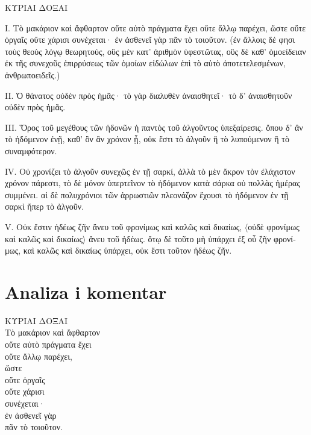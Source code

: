 {\large

\begin{greek}

\noindent ΚΥΡΙΑΙ ΔΟΞΑΙ

\noindent I. Τὸ μακάριον καὶ ἄφθαρτον οὔτε αὐτὸ πράγματα ἔχει οὔτε ἄλλῳ παρέχει, ὥστε οὔτε ὀργαῖς οὔτε χάρισι συνέχεται· ἐν ἀσθενεῖ γὰρ πᾶν τὸ τοιοῦτον. (ἐν ἄλλοις δέ φησι τοὺς θεοὺς λόγῳ θεωρητούς, οὓς μὲν κατ' ἀριθμὸν ὑφεστῶτας, οὓς δὲ καθ' ὁμοείδειαν ἐκ τῆς συνεχοῦς ἐπιρρύσεως τῶν ὁμοίων εἰδώλων ἐπὶ τὸ αὐτὸ ἀποτετελεσμένων, ἀνθρωποειδεῖς.)

\noindent II. Ὁ θάνατος οὐδὲν πρὸς ἡμᾶς· τὸ γὰρ διαλυθὲν ἀναισθητεῖ· τὸ δ' ἀναισθητοῦν οὐδὲν πρὸς ἡμᾶς.

\noindent III. Ὅρος τοῦ μεγέθους τῶν ἡδονῶν ἡ παντὸς τοῦ ἀλγοῦντος ὑπεξαίρεσις. ὅπου δ' ἂν τὸ ἡδόμενον ἐνῇ, καθ' ὃν ἂν χρόνον ᾖ, οὐκ ἔστι τὸ ἀλγοῦν ἢ τὸ λυπούμενον ἢ τὸ συναμφότερον.

\noindent IV. Οὐ χρονίζει τὸ ἀλγοῦν συνεχῶς ἐν τῇ σαρκί, ἀλλὰ τὸ μὲν ἄκρον τὸν ἐλάχιστον χρόνον πάρεστι, τὸ δὲ μόνον ὑπερτεῖνον τὸ ἡδόμενον κατὰ σάρκα οὐ πολλὰς ἡμέρας συμμένει. αἱ δὲ πολυχρόνιοι τῶν ἀρρωστιῶν πλεονάζον ἔχουσι τὸ ἡδόμενον ἐν τῇ σαρκὶ ἤπερ τὸ ἀλγοῦν.

\noindent V. Οὐκ ἔστιν ἡδέως ζῆν ἄνευ τοῦ φρονίμως καὶ καλῶς καὶ δικαίως, $\langle$οὐδὲ φρονίμως καὶ καλῶς καὶ δικαίως$\rangle$ ἄνευ τοῦ ἡδέως. ὅτῳ δὲ τοῦτο μὴ ὑπάρχει ἐξ οὗ ζῆν φρονίμως, καὶ καλῶς καὶ δικαίως ὑπάρχει, οὐκ ἔστι τοῦτον ἡδέως ζῆν.

\end{greek}

}


\section*{Analiza i komentar}


{\large
\begin{greek}
\noindent ΚΥΡΙΑΙ ΔΟΞΑΙ\\
Τὸ μακάριον καὶ ἄφθαρτον \\
οὔτε αὐτὸ πράγματα ἔχει \\
οὔτε ἄλλῳ παρέχει, \\
ὥστε \\
\tabto{2em} οὔτε ὀργαῖς \\
\tabto{2em} οὔτε χάρισι \\
συνέχεται· \\
ἐν ἀσθενεῖ γὰρ \\
πᾶν τὸ τοιοῦτον.\\

\end{greek}
}

